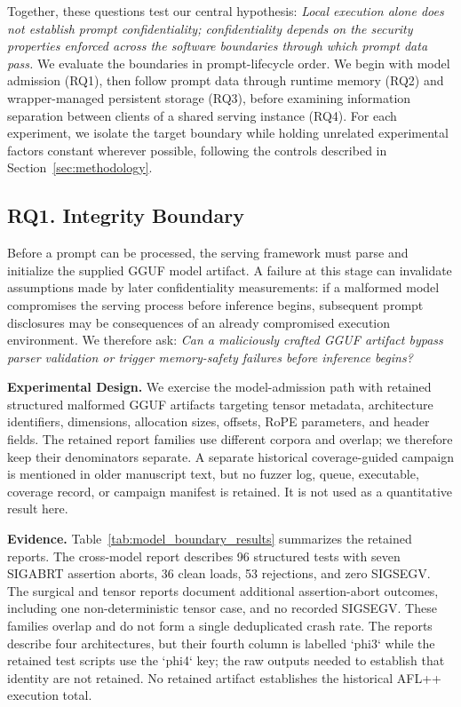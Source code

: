 \documentclass[journal,tifs]{IEEEtran}
\begin{document}
Together, these questions test our central hypothesis: 
%
\emph{Local execution alone does not establish prompt confidentiality;
confidentiality depends on the security properties enforced across the
software boundaries through which prompt data pass.} 
%
We evaluate the boundaries in prompt-lifecycle order. We begin with model
admission (RQ1), then follow prompt data through runtime memory (RQ2) and
wrapper-managed persistent storage (RQ3), before examining information
separation between clients of a shared serving instance (RQ4). For each
experiment, we isolate the target boundary while holding unrelated
experimental factors constant wherever possible, following the controls
described in Section~\ref{sec:methodology}.


\subsection{RQ1. Integrity Boundary}
\label{sec:rq1}

Before a prompt can be processed, the serving framework must parse and
initialize the supplied GGUF model artifact. A failure at this stage can
invalidate assumptions made by later confidentiality measurements: if a
malformed model compromises the serving process before inference begins,
subsequent prompt disclosures may be consequences of an already
compromised execution environment. We therefore ask: \emph{Can a maliciously crafted GGUF artifact bypass parser validation or trigger memory-safety failures before inference begins?}


{\bf Experimental Design.}
We exercise the model-admission path with retained structured malformed
GGUF artifacts targeting tensor metadata, architecture identifiers,
dimensions, allocation sizes, offsets, RoPE parameters, and header
fields. The retained report families use different corpora and overlap;
we therefore keep their denominators separate. A separate historical
coverage-guided campaign is mentioned in older manuscript text, but no
fuzzer log, queue, executable, coverage record, or campaign manifest is
retained. It is not used as a quantitative result here.


{\bf Evidence.}
Table~\ref{tab:model_boundary_results} summarizes the retained reports.
The cross-model report describes 96 structured tests with seven SIGABRT
assertion aborts, 36 clean loads, 53 rejections, and zero SIGSEGV. The
surgical and tensor reports document additional assertion-abort outcomes,
including one non-deterministic tensor case, and no recorded SIGSEGV. These
families overlap and do not form a single deduplicated crash rate. The
reports describe four architectures, but their fourth column is labelled
`phi3` while the retained test scripts use the `phi4` key; the raw outputs
needed to establish that identity are not retained. No retained artifact
establishes the historical AFL++ execution total.
\end{document}
